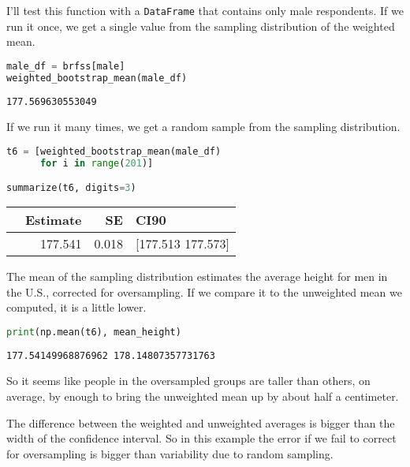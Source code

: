 I'll test this function with a \passthrough{\lstinline!DataFrame!} that
contains only male respondents. If we run it once, we get a single value
from the sampling distribution of the weighted mean.

\begin{lstlisting}[language=Python,style=source]
male_df = brfss[male]
weighted_bootstrap_mean(male_df)
\end{lstlisting}

\begin{lstlisting}[style=output]
177.569630553049
\end{lstlisting}

\pagebreak

If we run it many times, we get a random sample from the sampling
distribution.

\begin{lstlisting}[language=Python,style=source]
t6 = [weighted_bootstrap_mean(male_df)
      for i in range(201)]

summarize(t6, digits=3)
\end{lstlisting}

\begin{tabular}{lrrl}
\toprule
 & Estimate & SE & CI90 \\
\midrule
 & 177.541 & 0.018 & [177.513 177.573] \\
\bottomrule
\end{tabular}

The mean of the sampling distribution estimates the average height for
men in the U.S., corrected for oversampling. If we compare it to the
unweighted mean we computed, it is a little lower.

\begin{lstlisting}[language=Python,style=source]
print(np.mean(t6), mean_height)
\end{lstlisting}

\begin{lstlisting}[style=output]
177.54149968876962 178.14807357731763
\end{lstlisting}

So it seems like people in the oversampled groups are taller than
others, on average, by enough to bring the unweighted mean up by about
half a centimeter.

The difference between the weighted and unweighted averages is bigger
than the width of the confidence interval. So in this example the error
if we fail to correct for oversampling is bigger than variability due to
random sampling.

